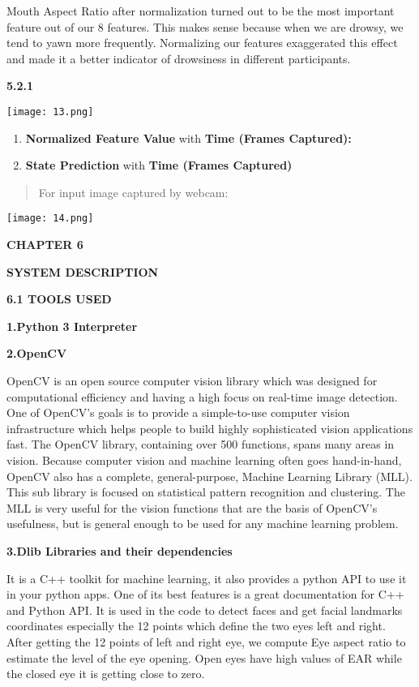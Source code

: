 \documentclass[a4paper,12pt]{article}
\begin{document}
Mouth Aspect Ratio after normalization turned out to be the most
important feature out of our 8 features. This makes sense because when
we are drowsy, we tend to yawn more frequently. Normalizing our features
exaggerated this effect and made it a better indicator of drowsiness in
different participants.

\textbf{5.2.1}

\texttt{[image: 13.png]}

\begin{enumerate}
\def\labelenumi{\arabic{enumi}.}
\setcounter{enumi}{1}
\item
  \textbf{Normalized Feature Value} with \textbf{Time (Frames
  Captured):}
\item
  \textbf{State Prediction} with \textbf{Time (Frames Captured)}
\end{enumerate}

\begin{quote}
For input image captured by webcam:
\end{quote}

\texttt{[image: 14.png]}

\textbf{CHAPTER 6}

\textbf{SYSTEM DESCRIPTION}

\textbf{6.1 TOOLS USED}

\textbf{1.Python 3 Interpreter}

\textbf{2.OpenCV}

OpenCV is an open source computer vision library which was designed for
computational efficiency and having a high focus on real-time image
detection. One of OpenCV's goals is to provide a simple-to-use computer
vision infrastructure which helps people to build highly sophisticated
vision applications fast. The OpenCV library, containing over 500
functions, spans many areas in vision. Because computer vision and
machine learning often goes hand-in-hand, OpenCV also has a complete,
general-purpose, Machine Learning Library (MLL). This sub library is
focused on statistical pattern recognition and clustering. The MLL is
very useful for the vision functions that are the basis of OpenCV's
usefulness, but is general enough to be used for any machine learning
problem.

\textbf{3.Dlib Libraries and their dependencies}

It is a C++ toolkit for machine learning, it also provides a python API
to use it in your python apps. One of its best features is a great
documentation for C++ and Python API. It is used in the code to detect
faces and get facial landmarks coordinates especially the 12 points
which define the two eyes left and right. After getting the 12 points of
left and right eye, we compute Eye aspect ratio to estimate the level of
the eye opening. Open eyes have high values of EAR while the closed eye
it is getting close to zero.
\end{document}
